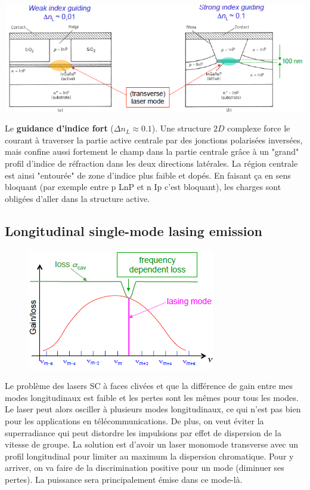 \begin{center}
	\includegraphics[scale=0.87]{ch4/image15}
\end{center}

Le \textbf{guidance d'indice fort} ($\Delta n_L\approx0.1$). Une structure $2D$ complexe force le
courant à traverser la partie active centrale par des jonctions polarisées inversées, mais confine 
aussi fortement le champ dans la partie centrale grâce à un "grand" profil d'indice de réfraction dans 
les deux directions latérales. La région centrale est ainsi "entourée" de zone d'indice plus faible 
et dopés. En faisant ça en sens bloquant (par exemple entre p LnP et n Ip c'est bloquant), les charges
sont obligées d'aller dans la structure active.


\newpage
\subsection{Longitudinal single-mode lasing emission}
	\begin{figure}
	\includegraphics[scale=0.7]{ch4/image16}
	\end{figure}
Le problème des lasers SC à faces clivées et que la différence de gain entre mes modes longitudinaux
est faible et les pertes sont les mêmes pour tous les modes. Le laser peut alors osciller à plusieurs
modes longitudinaux, ce qui n'est pas bien pour les applications en télécommunications. De plus, on
veut éviter la superradiance qui peut distordre les impulsions par effet de dispersion de la vitesse
de groupe. La solution est d'avoir un laser monomode transverse avec un profil longitudinal pour limiter
au maximum la dispersion chromatique. Pour y arriver, on va faire de la discrimination positive pour
un mode (diminuer ses pertes). La puissance sera principalement émise dans ce mode-là.\\

